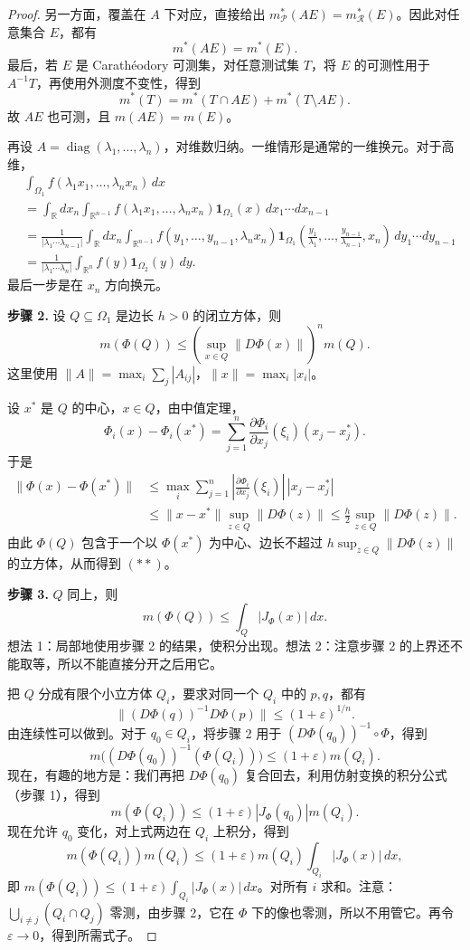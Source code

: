 \documentclass[12pt,letterpaper,twoside,openright]{ctexbook}
\theoremstyle{bluehead}
\theoremstyle{olivehead}
\theoremstyle{orangehead}
\theoremstyle{redremark}
\begin{document}
\begin{proof}
另一方面，覆盖在 $A$ 下对应，直接给出 $m_{\mathcal P}^*(AE)=m_{\mathcal R}^*(E)$。因此对任意集合 $E$，都有
\[
m^*(AE)=m^*(E).
\]
最后，若 $E$ 是 Carathéodory 可测集，对任意测试集 $T$，将 $E$ 的可测性用于 $A^{-1}T$，再使用外测度不变性，得到
\[
m^*(T)=m^*(T\cap AE)+m^*(T\setminus AE).
\]
故 $AE$ 也可测，且 $m(AE)=m(E)$。

再设 $A=\operatorname{diag}(\lambda_1,\ldots,\lambda_n)$，对维数归纳。一维情形是通常的一维换元。对于高维，
\[
\begin{aligned}
&\int_{\Omega_1}f(\lambda_1x_1,\ldots,\lambda_nx_n)\,dx\\
&=\int_{\mathbb R}dx_n\int_{\mathbb R^{n-1}}
 f(\lambda_1x_1,\ldots,\lambda_nx_n)\mathbf1_{\Omega_1}(x)\,dx_1\cdots dx_{n-1}\\
&=\frac1{|\lambda_1\cdots\lambda_{n-1}|}
\int_{\mathbb R}dx_n\int_{\mathbb R^{n-1}}
 f(y_1,\ldots,y_{n-1},\lambda_nx_n)
 \mathbf1_{\Omega_1}\!\left(\frac{y_1}{\lambda_1},\ldots,\frac{y_{n-1}}{\lambda_{n-1}},x_n\right)\,dy_1\cdots dy_{n-1}\\
&=\frac1{|\lambda_1\cdots\lambda_n|}
\int_{\mathbb R^n}f(y)\mathbf1_{\Omega_2}(y)\,dy.
\end{aligned}
\]
最后一步是在 $x_n$ 方向换元。

\textbf{步骤 2.} 设 $Q\subseteq\Omega_1$ 是边长 $h>0$ 的闭立方体，则
\[
m(\Phi(Q))\leq\left(\sup_{x\in Q}\|D\Phi(x)\|\right)^n m(Q).\tag{**}
\]
这里使用 $\|A\|=\max_i\sum_j|A_{ij}|$，$\|x\|=\max_i|x_i|$。

设 $x^*$ 是 $Q$ 的中心，$x\in Q$，由中值定理，
\[
\Phi_i(x)-\Phi_i(x^*)
=\sum_{j=1}^n\frac{\partial\Phi_i}{\partial x_j}(\xi_i)(x_j-x_j^*).
\]
于是
\[
\begin{aligned}
\|\Phi(x)-\Phi(x^*)\|
&\leq\max_i\sum_{j=1}^n
\left|\frac{\partial\Phi_i}{\partial x_j}(\xi_i)\right|\,|x_j-x_j^*|\\
&\leq\|x-x^*\|\sup_{z\in Q}\|D\Phi(z)\|
\leq\frac h2\sup_{z\in Q}\|D\Phi(z)\|.
\end{aligned}
\]
由此 $\Phi(Q)$ 包含于一个以 $\Phi(x^*)$ 为中心、边长不超过 $h\sup_{z\in Q}\|D\Phi(z)\|$ 的立方体，从而得到 $(**)$。

\textbf{步骤 3.} $Q$ 同上，则
\[
m(\Phi(Q))\leq\int_Q|J_\Phi(x)|\,dx.
\]
想法 1：局部地使用步骤 2 的结果，使积分出现。想法 2：注意步骤 2 的上界还不能取等，所以不能直接分开之后用它。

把 $Q$ 分成有限个小立方体 $Q_i$，要求对同一个 $Q_i$ 中的 $p,q$，都有
\[
\|(D\Phi(q))^{-1}D\Phi(p)\|\leq(1+\varepsilon)^{1/n}.
\]
由连续性可以做到。对于 $q_0\in Q_i$，将步骤 2 用于 $(D\Phi(q_0))^{-1}\circ\Phi$，得到
\[
m\bigl((D\Phi(q_0))^{-1}(\Phi(Q_i))\bigr)
\leq(1+\varepsilon)m(Q_i).
\]
现在，有趣的地方是：我们再把 $D\Phi(q_0)$ 复合回去，利用仿射变换的积分公式（步骤 1），得到
\[
m(\Phi(Q_i))\leq(1+\varepsilon)|J_\Phi(q_0)|m(Q_i).
\]
现在允许 $q_0$ 变化，对上式两边在 $Q_i$ 上积分，得到
\[
m(\Phi(Q_i))m(Q_i)
\leq(1+\varepsilon)m(Q_i)\int_{Q_i}|J_\Phi(x)|\,dx,
\]
即 $m(\Phi(Q_i))\leq(1+\varepsilon)\int_{Q_i}|J_\Phi(x)|\,dx$。对所有 $i$ 求和。注意：$\bigcup_{i\ne j}(Q_i\cap Q_j)$ 零测，由步骤 2，它在 $\Phi$ 下的像也零测，所以不用管它。再令 $\varepsilon\to0$，得到所需式子。


\end{proof}
\end{document}
